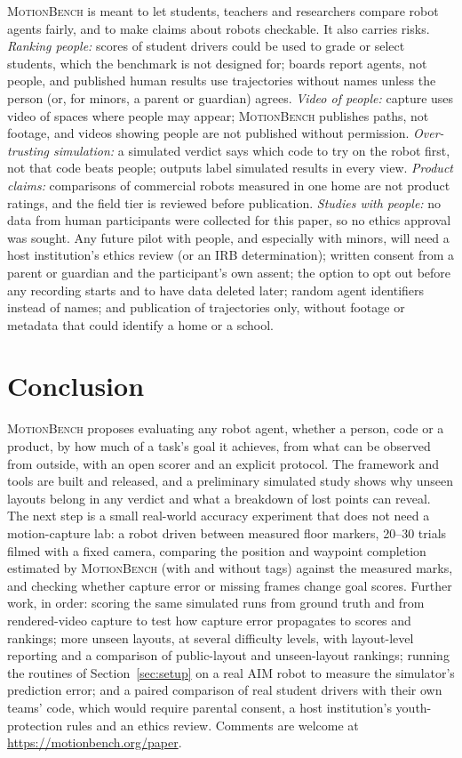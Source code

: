 \documentclass[11pt]{article}
\newcommand{\mb}{\textsc{MotionBench}}
\begin{document}
\mb{} is meant to let students, teachers and researchers compare robot agents fairly, and to make
claims about robots checkable. It also carries risks. \emph{Ranking people:} scores of student drivers
could be used to grade or select students, which the benchmark is not designed for; boards report
agents, not people, and published human results use trajectories without names unless the person
(or, for minors, a parent or guardian) agrees. \emph{Video of people:} capture uses video of spaces
where people may appear; \mb{} publishes paths, not footage, and videos showing people are not published
without permission. \emph{Over-trusting simulation:} a simulated verdict says which code to try on
the robot first, not that code beats people; outputs label simulated results in every view.
\emph{Product claims:} comparisons of commercial robots measured in one home are not product ratings,
and the field tier is reviewed before publication. \emph{Studies with people:} no data from human
participants were collected for this paper, so no ethics approval was sought. Any future pilot with
people, and especially with minors, will need a host institution's ethics review (or an IRB
determination); written consent from a parent or guardian and the participant's own assent; the
option to opt out before any recording starts and to have data deleted later; random agent
identifiers instead of names; and publication of trajectories only, without footage or metadata that
could identify a home or a school.

\section{Conclusion}

\mb{} proposes evaluating any robot agent, whether a person, code or a product, by how much of a
task's goal it achieves, from what can be observed from outside, with an open scorer and an explicit
protocol. The framework and tools are built and released, and a preliminary simulated study shows why
unseen layouts belong in any verdict and what a breakdown of lost points can reveal. The next step is a small real-world accuracy experiment that does not need a motion-capture lab: a
robot driven between measured floor markers, 20--30 trials filmed with a fixed camera, comparing the
position and waypoint completion estimated by \mb{} (with and without tags) against the measured marks,
and checking whether capture error or missing frames change goal scores. Further work, in order:
scoring the same simulated runs from ground truth and from rendered-video capture to test how capture
error propagates to scores and rankings; more unseen layouts, at several difficulty levels, with
layout-level reporting and a comparison of public-layout and unseen-layout rankings; running the
routines of Section~\ref{sec:setup} on a real AIM robot to measure the simulator's prediction error;
and a paired comparison of real student drivers with their own teams' code, which would require
parental consent, a host institution's youth-protection rules and an ethics review.
Comments are welcome at \url{https://motionbench.org/paper}.
\end{document}
